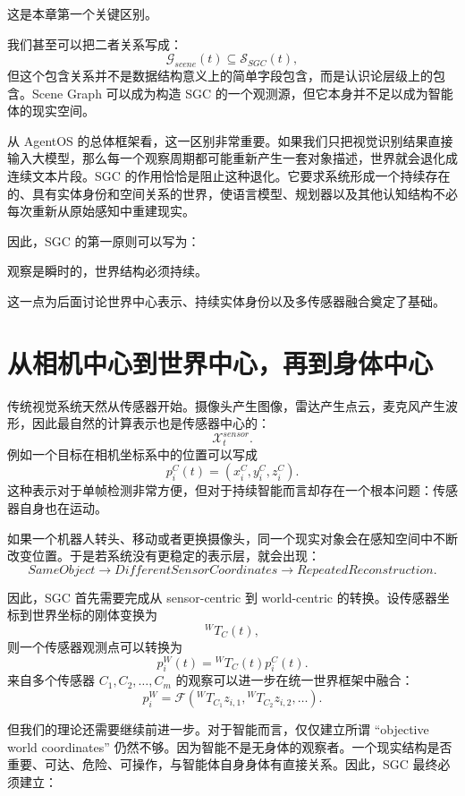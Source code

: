 这是本章第一个关键区别。

我们甚至可以把二者关系写成：
\[
\mathcal{G}_{scene}(t)
\subseteq
\mathcal{S}_{SGC}(t),
\]
但这个包含关系并不是数据结构意义上的简单字段包含，而是认识论层级上的包含。Scene Graph 可以成为构造 SGC 的一个观测源，但它本身并不足以成为智能体的现实空间。

从 AgentOS 的总体框架看，这一区别非常重要。如果我们只把视觉识别结果直接输入大模型，那么每一个观察周期都可能重新产生一套对象描述，世界就会退化成连续文本片段。SGC 的作用恰恰是阻止这种退化。它要求系统形成一个持续存在的、具有实体身份和空间关系的世界，使语言模型、规划器以及其他认知结构不必每次重新从原始感知中重建现实。

因此，SGC 的第一原则可以写为：
\begin{statementbox}
\centering
{}
\end{statementbox}

观察是瞬时的，世界结构必须持续。

这一点为后面讨论世界中心表示、持续实体身份以及多传感器融合奠定了基础。

\section{从相机中心到世界中心，再到身体中心}

传统视觉系统天然从传感器开始。摄像头产生图像，雷达产生点云，麦克风产生波形，因此最自然的计算表示也是传感器中心的：
\[
\mathcal{X}^{sensor}_t.
\]
例如一个目标在相机坐标系中的位置可以写成
\[
p_i^{C}(t)
=
(x_i^C,y_i^C,z_i^C).
\]
这种表示对于单帧检测非常方便，但对于持续智能而言却存在一个根本问题：传感器自身也在运动。

如果一个机器人转头、移动或者更换摄像头，同一个现实对象会在感知空间中不断改变位置。于是若系统没有更稳定的表示层，就会出现：
\[
SameObject
\rightarrow
DifferentSensorCoordinates
\rightarrow
RepeatedReconstruction.
\]

因此，SGC 首先需要完成从 sensor-centric 到 world-centric 的转换。设传感器坐标到世界坐标的刚体变换为
\[
{}^{W}T_{C}(t),
\]
则一个传感器观测点可以转换为
\[
p_i^{W}(t)
=
{}^{W}T_{C}(t)p_i^{C}(t).
\]
来自多个传感器 \(C_1,C_2,\ldots,C_m\) 的观察可以进一步在统一世界框架中融合：
\[
p_i^{W}
=
\mathcal{F}
\left(
{}^{W}T_{C_1}z_{i,1},
{}^{W}T_{C_2}z_{i,2},
\ldots
\right).
\]

但我们的理论还需要继续前进一步。对于智能而言，仅仅建立所谓 ``objective world coordinates'' 仍然不够。因为智能不是无身体的观察者。一个现实结构是否重要、可达、危险、可操作，与智能体自身身体有直接关系。因此，SGC 最终必须建立：
\begin{statementbox}
\centering
{}
\end{statementbox}

